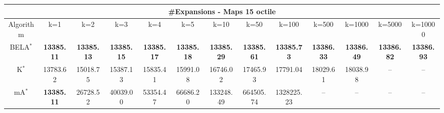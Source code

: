 \begin{tabular}{c|cccccccccccc}\toprule
\multicolumn{13}{c}{#Expansions - Maps 15 octile}\\ \midrule
Algorithm & k=1 & k=2 & k=3 & k=4 & k=5 & k=10 & k=50 & k=100 & k=500 & k=1000 & k=5000 & k=10000 \\ \midrule
BELA$^*$ & \textbf{13385.11} & \textbf{13385.13} & \textbf{13385.15} & \textbf{13385.17} & \textbf{13385.18} & \textbf{13385.29} & \textbf{13385.61} & \textbf{13385.73} & \textbf{13386.33} & \textbf{13386.49} & \textbf{13386.82} & \textbf{13386.93} \\
K$^*$ & 13783.62 & 15018.75 & 15387.13 & 15835.41 & 15991.08 & 16746.02 & 17465.93 & 17791.04 & 18029.61 & 18038.98 & -- & -- \\
mA$^*$ & \textbf{13385.11} & 26728.52 & 40039.00 & 53354.47 & 66686.20 & 133248.49 & 664505.74 & 1328225.23 & -- & -- & -- & -- \\ \bottomrule 
\end{tabular}
